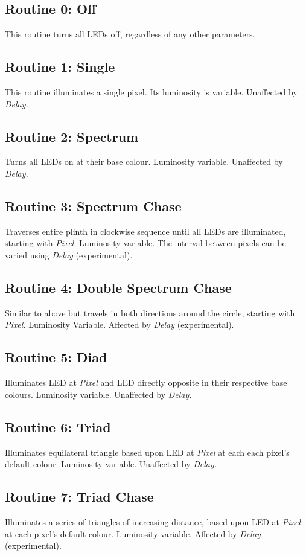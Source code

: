\documentclass{article}
\begin{document}
	\subsection{Routine 0: Off}
	This routine turns all LEDs off, regardless of any other parameters.

	\subsection{Routine 1: Single}
	This routine illuminates a single pixel. Its luminosity is variable. 
	Unaffected by \emph{Delay.}

	\subsection{Routine 2: Spectrum}
	Turns all LEDs on at their base colour. Luminosity variable. Unaffected by 
	\emph{Delay.}

	\subsection{Routine 3: Spectrum Chase}
	Traverses entire plinth in clockwise sequence until all LEDs are 
	illuminated, starting with \emph{Pixel}. Luminosity variable. The interval 
	between pixels can be varied using \emph{Delay} (experimental).

	\subsection{Routine 4: Double Spectrum Chase}
	Similar to above but travels in both directions around the circle, starting 
	with \emph{Pixel.} Luminosity Variable. Affected by \emph{Delay} 
	(experimental).

	\subsection{Routine 5: Diad}
	Illuminates LED at \emph{Pixel} and LED directly opposite in their 
	respective base colours. Luminosity variable. Unaffected by \emph{Delay.}

	\subsection{Routine 6: Triad}
	Illuminates equilateral triangle based upon LED at \emph{Pixel} at each 
	each pixel's default colour. Luminosity variable. Unaffected by 
	\emph{Delay.}

	\subsection{Routine 7: Triad Chase}
	Illuminates a series of triangles of increasing distance, based upon LED at 
	\emph{Pixel} at each pixel's default colour. Luminosity variable. Affected 
	by \emph{Delay} (experimental).
\end{document}
